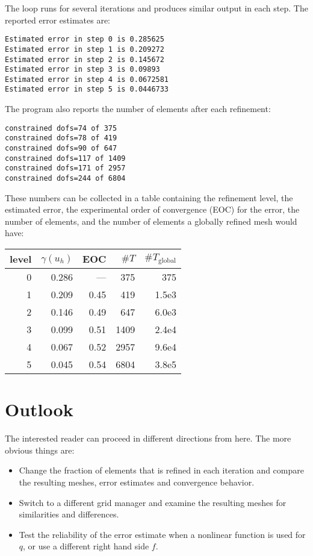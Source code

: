 \documentclass[a4paper,12pt]{article}
\begin{document}
The loop runs for several iterations and produces similar output in
each step. The reported error estimates are:
\begin{lstlisting}[basicstyle=\ttfamily\small,
frame=single,
backgroundcolor=\color{listingbg}]
Estimated error in step 0 is 0.285625
Estimated error in step 1 is 0.209272
Estimated error in step 2 is 0.145672
Estimated error in step 3 is 0.09893
Estimated error in step 4 is 0.0672581
Estimated error in step 5 is 0.0446733
\end{lstlisting}

The program also reports the number of elements after each refinement:
\begin{lstlisting}[basicstyle=\ttfamily\small,
frame=single,
backgroundcolor=\color{listingbg}]
constrained dofs=74 of 375
constrained dofs=78 of 419
constrained dofs=90 of 647
constrained dofs=117 of 1409
constrained dofs=171 of 2957
constrained dofs=244 of 6804
\end{lstlisting}

These numbers can be collected in a table containing the refinement level,
the estimated error, the experimental order of convergence (EOC) for the
error, the number of elements, and the number of elements a globally
refined mesh would have:
\begin{center}
  \begin{tabular}{rrrrr}
    level & $\gamma(u_h)$ & EOC & $\#T$ & $\#T_\text{global}$ \\
    \hline
    0 & 0.286 & ---  &  375 & 375   \\
    1 & 0.209 & 0.45 &  419 & 1.5e3 \\
    2 & 0.146 & 0.49 &  647 & 6.0e3 \\
    3 & 0.099 & 0.51 & 1409 & 2.4e4 \\
    4 & 0.067 & 0.52 & 2957 & 9.6e4 \\
    5 & 0.045 & 0.54 & 6804 & 3.8e5 \\
\end{tabular}
\end{center}

\section{Outlook}

The interested reader can proceed in different directions from here.
The more obvious things are:
\begin{itemize}
\item Change the fraction of elements that is refined in each iteration
  and compare the resulting meshes, error estimates and convergence
  behavior.
\item Switch to a different grid manager and examine the resulting meshes
  for similarities and differences.
\item Test the reliability of the error estimate when a nonlinear function
  is used for $q$, or use a different right hand side $f$.
\end{itemize}



\end{document}
